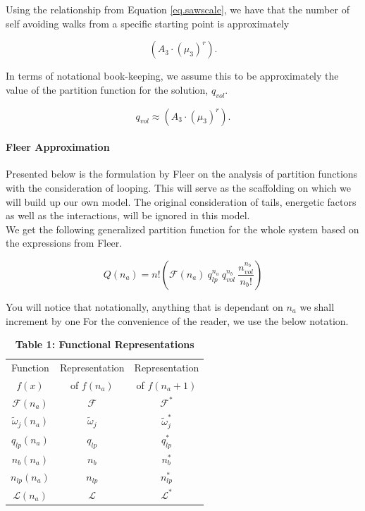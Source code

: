 \documentclass[12pt,letterpaper]{article}
\newcommand{\leng}{\mathcal{L}}
\newcommand{\fop}{\ensuremath{\mathcal{F}}}
\begin{document}
Using the relationship from Equation \ref{eq.sawscale}, we have that the number of self avoiding walks from a specific starting point is approximately 

\begin{equation}
	    \left(A_3\cdot (\mu_{3})^{r}\right).
	\label{eq. SAW}
\end{equation}

In terms of notational book-keeping, we assume this to be approximately the value of the partition function for the solution, $q_{vol}$.

\begin{equation}
	    q_{vol}\approx \left(A_3\cdot (\mu_{3})^{r}\right).
	\label{eq. q3}
\end{equation}


\paragraph{Fleer Approximation} Presented below is the formulation by Fleer \cite{fleer1993polymers} on the analysis of partition functions with the consideration of looping. This will serve as the scaffolding on which we will build up our own model. The original consideration of tails, energetic factors as well as the interactions, will be ignored in this model.\\

We get the following generalized partition function for the whole system based on the expressions from Fleer\cite{fleer1993polymers}.

\begin{equation}
	Q(n_a)
	=
	n!
	\left(
	    \fop(n_a)
	    ~
	    q_{lp}^{n_a}
	    ~
		q_{vol}^{n_{b}}
		~
		\frac{
			n_{vol}^{n_{b}}
		}{
			n_b!
		}
	\right)
	\label{Qfleer1}
\end{equation}


You will notice that notationally, anything that is dependant on $n_a$ we shall increment by one 
For the convenience of the reader, we use the below notation.

\begin{table}[H]
\begin{center}
\begin{tabular}{|c|c|c|}
    \hline
    Function  & Representation & Representation\\ $f(x)$ & of $f(n_a)$ & of $f(n_a+1)$  \\
    \hline\hline
    $\fop(n_a)$ & $\fop$  &  $\fop^{*}$\\  
    \hline
    $\tilde{\omega}_j(n_a)$ & $\tilde{\omega}_j$  &  $\tilde{\omega}_j^{*}$\\  
    \hline
    $q_{lp}(n_a)$ & $q_{lp}$  & $q_{lp}^{*}$\\
    \hline    
    $n_b(n_a)$ & $n_b$ & $n_b^{*}$\\
    \hline
    $n_{lp}(n_a)$ & $n_{lp}$ & $n_{lp}^{*}$\\
    \hline
    $\leng(n_a)$ & $\leng$ & $\leng^{*}$\\
    \hline
\end{tabular}
\end{center}
\caption*{\textbf{Table 1: Functional Representations}}
\end{table}
\end{document}

